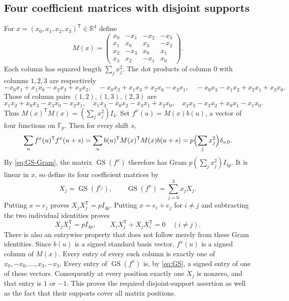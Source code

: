\documentclass[10pt]{article}
\newcommand{\F}{\mathbb F}
\newcommand{\GS}{\operatorname{GS}}
\begin{document}
\subsection{Four coefficient matrices with disjoint supports}
For $x=(x_0,x_1,x_2,x_3)^{\mathsf T}\in\mathbb R^4$ define
\[
 M(x)=\begin{pmatrix}
 x_0&-x_1&-x_2&-x_3\\
 x_1&x_0&x_3&-x_2\\
 x_2&-x_3&x_0&x_1\\
 x_3&x_2&-x_1&x_0
 \end{pmatrix}.
\]
Each column has squared length $\sum_jx_j^2$. The dot products of column
$0$ with columns $1,2,3$ are respectively
\[
 -x_0x_1+x_1x_0-x_2x_3+x_3x_2,\quad
 -x_0x_2+x_1x_3+x_2x_0-x_3x_1,\quad
 -x_0x_3-x_1x_2+x_2x_1+x_3x_0.
\]
Those of column pairs $(1,2),(1,3),(2,3)$ are
\[
 x_1x_2+x_0x_3-x_3x_0-x_2x_1,\quad
 x_1x_3-x_0x_2-x_3x_1+x_2x_0,\quad
 x_2x_3-x_3x_2+x_0x_1-x_1x_0.
\]
Thus $M(x)^{\mathsf T}M(x)=(\sum_jx_j^2)I_4$.
Set $f^x(u)=M(x)b(u)$, a vector of four functions on $\F_p$.
Then for every shift $s$,
\[
 \sum_u f^x(u)^{\mathsf T}f^x(u+s)
 =\sum_u b(u)^{\mathsf T}M(x)^{\mathsf T}M(x)b(u+s)
 =p\Bigl(\sum_jx_j^2\Bigr)\delta_{s,0}.
\]
By \eqref{eq:GS-Gram}, the matrix $\GS(f^x)$ therefore has Gram
$p(\sum_jx_j^2)I_{4p}$. It is linear in $x$, so define its four
coefficient matrices by
\[
 X_j=\GS(f^{e_j}),\qquad \GS(f^x)=\sum_{j=0}^3x_jX_j.
\]
Putting $x=e_j$ proves $X_jX_j^{\mathsf T}=pI_{4p}$. Putting
$x=e_i+e_j$ for $i\ne j$ and subtracting the two individual identities
proves
\begin{equation}\label{eq:X-identities}
 X_jX_j^{\mathsf T}=pI_{4p},\qquad
 X_iX_j^{\mathsf T}+X_jX_i^{\mathsf T}=0\quad(i\ne j).
\end{equation}
There is also an entrywise property that does not follow merely from
these Gram identities. Since $b(u)$ is a signed standard basis vector,
$f^x(u)$ is a signed column of $M(x)$. Every entry of every such column
is exactly one of $x_0,-x_0,\ldots,x_3,-x_3$. Every entry of
$\GS(f^x)$ is, by \eqref{eq:GS}, a signed entry of one of these vectors.
Consequently at every position exactly one $X_j$ is nonzero, and that
entry is $1$ or $-1$. This proves the required disjoint-support assertion
as well as the fact that their supports cover all matrix positions.
\end{document}
